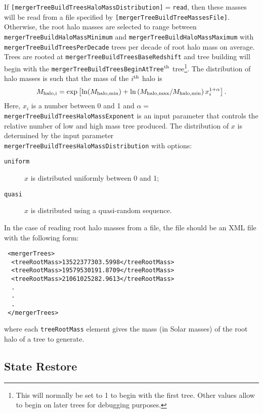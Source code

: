If {\tt [mergerTreeBuildTreesHaloMassDistribution]}$=${\tt read}, then these masses will be read from a file specified by {\tt [mergerTreeBuildTreeMassesFile]}. Otherwise, the root halo masses are selected to range between {\tt mergerTreeBuildHaloMassMinimum} and {\tt mergerTreeBuildHaloMassMaximum} with {\tt mergerTreeBuildTreesPerDecade} trees per decade of root halo mass on average. Trees are rooted at {\tt mergerTreeBuildTreesBaseRedshift} and tree building will begin with the {\tt mergerTreeBuildTreesBeginAtTree}$^{\rm th}$ tree\footnote{This will normally be set to 1 to begin with the first tree. Other values allow to begin on later trees for debugging purposes.}. The distribution of halo masses is such that the mass of the $i^{\rm th}$ halo is
\begin{equation}
 M_{\rm halo,i} = \exp\left[ \ln(M_{\rm halo,min}) + \ln\left({M_{\rm halo,max}/M_{\rm halo,min}}\right) x_i^{1+\alpha} \right].
\end{equation}
Here, $x_i$ is a number between 0 and 1 and $\alpha=${\tt mergerTreeBuildTreesHaloMassExponent} is an input parameter that controls the relative number of low and high mass tree produced. The distribution of $x$ is determined by the input parameter {\tt mergerTreeBuildTreesHaloMassDistribution} with options:
\begin{description}
 \item [{\tt uniform}] $x$ is distributed uniformly between 0 and 1;
 \item [{\tt quasi}] $x$ is distributed using a quasi-random sequence.
\end{description}

In the case of reading root halo masses from a file, the file should be an XML file with the following form:
\begin{verbatim}
 <mergerTrees>
  <treeRootMass>13522377303.5998</treeRootMass>
  <treeRootMass>19579530191.8709</treeRootMass>
  <treeRootMass>21061025282.9613</treeRootMass>
  .
  .
  .
 </mergerTrees>
\end{verbatim}
where each {\tt treeRootMass} element gives the mass (in Solar masses) of the root halo of a tree to generate.

\subsection{State Restore}\label{sec:TreeConstructStateRestore}

